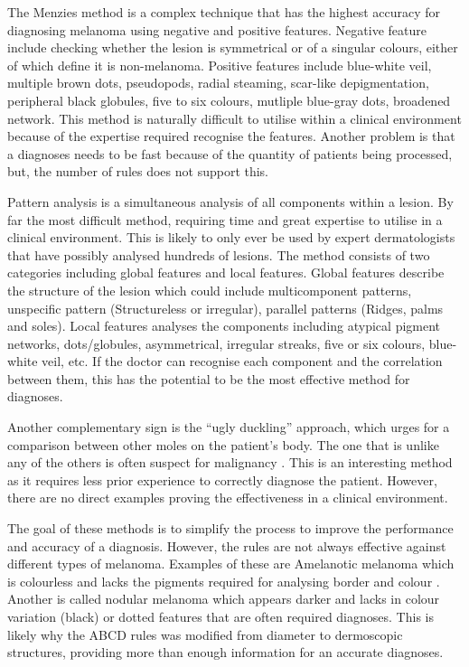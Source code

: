 \documentclass[12pt]{report}
\begin{document}
The Menzies method is a complex technique that has the highest accuracy\cite{Carrera2016} for diagnosing melanoma using negative and positive features. Negative feature include checking whether the lesion is symmetrical or of a singular colours, either of which define it is non-melanoma. Positive features include blue-white veil, multiple brown dots, pseudopods, radial steaming, scar-like depigmentation, peripheral black globules, five to six colours, mutliple blue-gray dots, broadened network. This method is naturally difficult to utilise within a clinical environment because of the expertise required recognise the features. Another problem is that a diagnoses needs to be fast because of the quantity of patients being processed, but, the number of rules does not support this.

Pattern analysis is a simultaneous analysis of all components within a lesion. By far the most difficult method, requiring time and great expertise to utilise in a clinical environment. This is likely to only ever be used by expert dermatologists that have possibly analysed hundreds of lesions. The method consists of two categories including global features and local features. Global features describe the structure of the lesion which could include multicomponent patterns, unspecific pattern (Structureless or irregular), parallel patterns (Ridges, palms and soles). Local features analyses the components including atypical pigment networks, dots/globules, asymmetrical, irregular streaks, five or six colours, blue-white veil, etc. If the doctor can recognise each component and the correlation between them, this has the potential to be the most effective method for diagnoses.

Another complementary sign is the “ugly duckling” approach, which urges for a comparison between other moles on the patient’s body. The one that is unlike any of the others is often suspect for malignancy \cite{Jensen2015}. This is an interesting method as it requires less prior experience to correctly diagnose the patient. However, there are no direct examples proving the effectiveness in a clinical environment.

The goal of these methods is to simplify the process to improve the performance and accuracy of a diagnosis. However, the rules are not always effective against different types of melanoma. Examples of these are Amelanotic melanoma which is colourless and lacks the pigments required for analysing border and colour \cite{Pizzichetta2004}. Another is called nodular melanoma which appears darker and lacks in colour variation (black) or dotted features that are often required diagnoses. This is likely why the ABCD rules was modified from diameter to dermoscopic structures, providing more than enough information for an accurate diagnoses.
\end{document}
